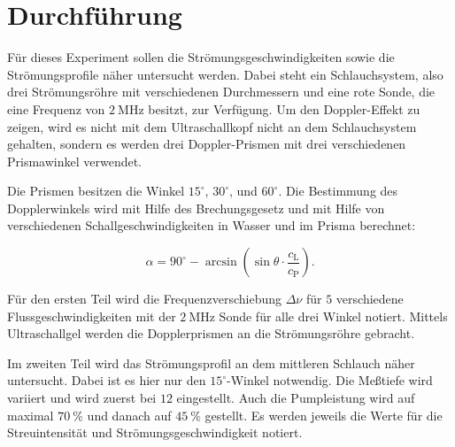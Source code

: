 \section{Durchführung}
\label{sec:Durchführung}
Für dieses Experiment sollen die Strömungsgeschwindigkeiten sowie die Strömungsprofile näher untersucht werden. Dabei steht ein Schlauchsystem, also drei Strömungsröhre mit verschiedenen Durchmessern und eine rote Sonde, die eine Frequenz von 
$\SI{2}{\mega\hertz}$ besitzt, zur Verfügung. Um den Doppler-Effekt zu zeigen, wird es nicht mit dem Ultraschallkopf nicht an dem Schlauchsystem gehalten, sondern es werden drei Doppler-Prismen mit drei verschiedenen Prismawinkel verwendet.

Die Prismen besitzen die Winkel $15 ^\circ$, $30 ^\circ$, und $60 ^\circ$. Die Bestimmung des Dopplerwinkels wird mit Hilfe des Brechungsgesetz und mit Hilfe von verschiedenen Schallgeschwindigkeiten in Wasser und im Prisma berechnet:

\begin{equation}
\alpha = 90^\circ - \arcsin\left(\sin\theta\cdot\frac{c_\text{L}}{c_\text{P}}\right).
\label{eq:eq7}
\end{equation}

Für den ersten Teil wird die Frequenzverschiebung $\Delta\nu$ für $5$ verschiedene Flussgeschwindigkeiten mit der $\SI{2}{\mega\hertz}$ Sonde für alle drei Winkel notiert. Mittels Ultraschallgel werden die Dopplerprismen an die Strömungsröhre gebracht. 

Im zweiten Teil wird das Strömungsprofil an dem mittleren Schlauch näher untersucht. Dabei ist es hier nur den $15 ^\circ$-Winkel notwendig. Die Meßtiefe wird variiert und wird zuerst bei $12$ eingestellt. Auch die Pumpleistung wird auf maximal
 $\SI{70}{\percent}$ und danach auf $\SI{45}{\percent}$ gestellt. Es werden jeweils die Werte für die Streuintensität und Strömungsgeschwindigkeit notiert. 